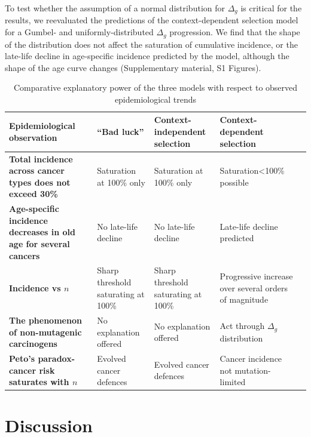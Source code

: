 \documentclass[9pt,twocolumn,twoside]{pnas-new}
\begin{document}
To test whether the assumption of a normal distribution for $\Delta_{g}$ is critical for the results, we reevaluated the predictions of the context-dependent selection model for a Gumbel- and uniformly-distributed $\Delta_{g}$ progression. We find that the shape of the distribution does not affect the saturation of cumulative incidence, or the late-life decline in age-specific incidence predicted by the model, although the shape of the age curve changes (Supplementary material, S1 Figures).

\begin{table}[h]
	\centering
	\caption{Comparative explanatory power of the three models with respect to observed epidemiological trends}
	\begin{tabular}{p{5cm}p{4cm}p{4cm}p{3.5cm}p{7cm}}
	\textbf{Epidemiological observation} & ``Bad luck'' & Context-independent selection & Context-dependent selection \\
	\hline
	\textbf{Total incidence across cancer types does not exceed 30\%} & Saturation at 100\% only & Saturation at 100\% only & Saturation<100\% possible \\
	\textbf{Age-specific incidence decreases in old age for several cancers} & No late-life decline & No late-life decline & Late-life decline predicted \\
	\textbf{Incidence vs $n$} & Sharp threshold saturating at 100\% & Sharp threshold saturating at 100\% & Progressive increase over several orders of magnitude \\
	\textbf{The phenomenon of non-mutagenic carcinogens} & No explanation offered & No explanation offered & Act through $\Delta_{g}$ distribution \\
	\textbf{Peto's paradox-cancer risk saturates with $n$} & Evolved cancer defences & Evolved cancer defences & Cancer incidence not mutation-limited \\
	\hline
	\end{tabular}
	\label{Table 1}
\end{table}

\section{Discussion}
\end{document}
